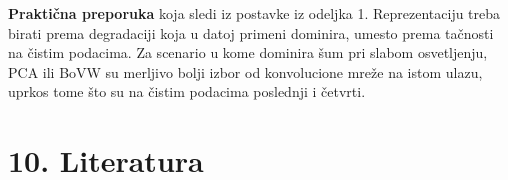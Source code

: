 \documentclass[11pt,a4paper]{article}
\begin{document}
\textbf{Praktična preporuka} koja sledi iz postavke iz odeljka 1. Reprezentaciju treba birati
prema degradaciji koja u datoj primeni dominira, umesto prema tačnosti na čistim podacima. Za
scenario u kome dominira šum pri slabom osvetljenju, PCA ili BoVW su merljivo bolji izbor od
konvolucione mreže na istom ulazu, uprkos tome što su na čistim podacima poslednji i četvrti.

\newpage

\section*{10. Literatura}



\end{document}
